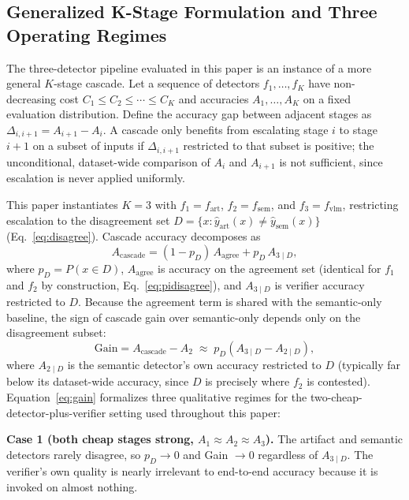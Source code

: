 \documentclass{ieeeaccess}
\begin{document}
\subsection{Generalized K-Stage Formulation and Three Operating Regimes}
\label{sec:kstage}

The three-detector pipeline evaluated in this paper is an instance of a more
general $K$-stage cascade. Let a sequence of detectors $f_1, \ldots, f_K$
have non-decreasing cost $C_1 \le C_2 \le \cdots \le C_K$ and accuracies
$A_1, \ldots, A_K$ on a fixed evaluation distribution. Define the accuracy
gap between adjacent stages as $\Delta_{i,i+1} = A_{i+1} - A_i$. A cascade
only benefits from escalating stage $i$ to stage $i{+}1$ on a subset of
inputs if $\Delta_{i,i+1}$ restricted to that subset is positive; the
unconditional, dataset-wide comparison of $A_i$ and $A_{i+1}$ is not
sufficient, since escalation is never applied uniformly.

This paper instantiates $K=3$ with $f_1 = f_{\text{art}}$, $f_2 = f_{\text{sem}}$,
and $f_3 = f_{\text{vlm}}$, restricting escalation to the disagreement set
$D = \{x : \hat y_{\text{art}}(x) \neq \hat y_{\text{sem}}(x)\}$
(Eq.~\eqref{eq:disagree}). Cascade accuracy decomposes as
\begin{equation}
A_{\text{cascade}} = (1-p_D)\, A_{\text{agree}} + p_D\, A_{3\mid D},
\label{eq:decomp}
\end{equation}
where $p_D = P(x \in D)$, $A_{\text{agree}}$ is accuracy on the agreement set
(identical for $f_1$ and $f_2$ by construction, Eq.~\eqref{eq:pidisagree}),
and $A_{3\mid D}$ is verifier accuracy restricted to $D$. Because the
agreement term is shared with the semantic-only baseline, the sign of
cascade gain over semantic-only depends only on the disagreement subset:
\begin{equation}
\text{Gain} = A_{\text{cascade}} - A_2 \;\approx\; p_D \left( A_{3\mid D} - A_{2\mid D} \right),
\label{eq:gain}
\end{equation}
where $A_{2\mid D}$ is the semantic detector's own accuracy restricted to
$D$ (typically far below its dataset-wide accuracy, since $D$ is precisely
where $f_2$ is contested). Equation~\eqref{eq:gain} formalizes three
qualitative regimes for the two-cheap-detector-plus-verifier setting used
throughout this paper:

\textbf{Case 1 (both cheap stages strong, $A_1 \approx A_2 \approx A_3$).}
The artifact and semantic detectors rarely disagree, so $p_D \to 0$ and
Gain $\to 0$ regardless of $A_{3\mid D}$. The verifier's own quality is
nearly irrelevant to end-to-end accuracy because it is invoked on almost
nothing.
\end{document}
